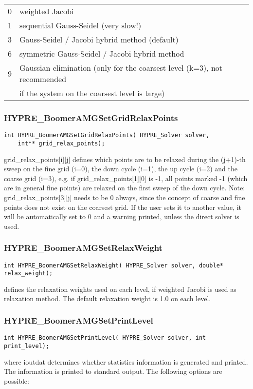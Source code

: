 \begin{tabular}{l l}
 0 & weighted Jacobi \\
 1 & sequential Gauss-Seidel (very slow!) \\
 3 & Gauss-Seidel / Jacobi hybrid method (default) \\
 6 & symmetric Gauss-Seidel / Jacobi hybrid method \\
 9 & Gaussian elimination (only for the coarsest level (k=3), not recommended\\ 
 & if the system on the coarsest level is large)\\
\end{tabular}

\subsubsection*{HYPRE\_BoomerAMGSetGridRelaxPoints}
\begin{display}
\begin{verbatim}
int HYPRE_BoomerAMGSetGridRelaxPoints( HYPRE_Solver solver, 
	int** grid_relax_points);
\end{verbatim}
\end{display}
grid\_relax\_points[i][j] defines which points are to be relaxed during
the (j+1)-th sweep on the fine 
grid (i=0), the down cycle (i=1), the up cycle (i=2) and the coarse grid (i=3),
e.g. if grid\_relax\_points[1][0] is -1, all points marked -1 (which are in
general fine points) are relaxed on the first sweep of the down cycle.
Note: grid\_relax\_points[3][j] needs to be 0 always, since the concept of 
coarse and fine points does not exist on the coarsest grid. If the user
sets it to another value, it will be automatically set to 0 and a warning
printed, unless the direct solver is used.

\subsubsection*{HYPRE\_BoomerAMGSetRelaxWeight}
\begin{display}
\begin{verbatim}
int HYPRE_BoomerAMGSetRelaxWeight( HYPRE_Solver solver, double* relax_weight);
\end{verbatim}
\end{display}
defines the relaxation weights used on each level, if weighted Jacobi is used
as relaxation method. The default relaxation weight is 1.0 on each level.

\subsubsection*{HYPRE\_BoomerAMGSetPrintLevel}
\begin{display}
\begin{verbatim}
int HYPRE_BoomerAMGSetPrintLevel( HYPRE_Solver solver, int print_level);
\end{verbatim}
\end{display}
where ioutdat determines whether statistics information is generated and 
printed. The information is printed to standard output.
The following options are possible:

